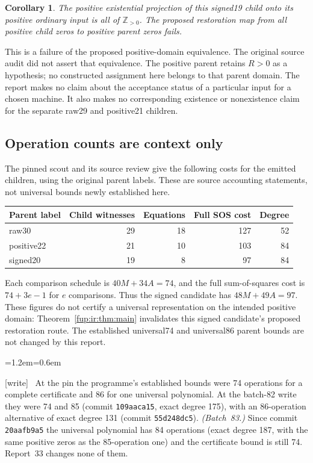 \documentclass[11pt,letterpaper]{article}
\newtheorem{corollary}[theorem]{Corollary}
\theoremstyle{definition}\newtheorem{definition}[theorem]{Definition}
\theoremstyle{remark}\newtheorem{remark}[theorem]{Remark}
\newcommand{\pos}{\mathbb Z_{>0}}
\newcommand{\wtag}{\textup{[write]}}
\newenvironment{writenote}{\par\smallskip\begin{list}{}{\leftmargin=1.2em\rightmargin=0.6em}\item[]\small\wtag\ }{\end{list}\smallskip}
\begin{document}
\begin{corollary}\label{fup:ir:cor:projection}
The positive existential projection of this signed19 child onto its positive ordinary input is all of $\pos$. The proposed restoration map from all positive child zeros to positive parent zeros fails.
\end{corollary}
This is a failure of the proposed positive-domain equivalence. The original source audit did not assert that equivalence. The positive parent retains $R>0$ as a hypothesis; no constructed assignment here belongs to that parent domain. The report makes no claim about the acceptance status of a particular input for a chosen machine. It also makes no corresponding existence or nonexistence claim for the separate raw29 and positive21 children.

\subsection{Operation counts are context only}
The pinned scout and its source review give the following costs for the emitted children, using the original parent labels. These are source accounting statements, not universal bounds newly established here.
\begin{center}
\begin{tabular}{lrrrr}
\toprule
Parent label & Child witnesses & Equations & Full SOS cost & Degree\\
\midrule
raw30 & 29 & 18 & 127 & 52\\
positive22 & 21 & 10 & 103 & 84\\
signed20 & 19 & 8 & 97 & 84\\
\bottomrule
\end{tabular}
\end{center}
Each comparison schedule is $40M+34A=74$, and the full sum-of-squares cost is $74+3e-1$ for $e$ comparisons. Thus the signed candidate has $48M+49A=97$. These figures do not certify a universal representation on the intended positive domain: Theorem~\ref{fup:ir:thm:main} invalidates this signed candidate's proposed restoration route. The established universal74 and universal86 parent bounds are not changed by this report.
\begin{writenote}
At the pin the programme's established bounds were 74 operations for a complete certificate and 86 for one universal polynomial. At the batch-82 write they were 74 and 85 (commit \texttt{109aaca15}, exact degree 175), with an 86-operation alternative of exact degree 131 (commit \texttt{55d248dc5}). \emph{(Batch~83.)} Since commit \texttt{20aafb9a5} the universal polynomial has 84 operations (exact degree 187, with the same positive zeros as the 85-operation one) and the certificate bound is still 74. Report~33 changes none of them.
\end{writenote}
\end{document}
